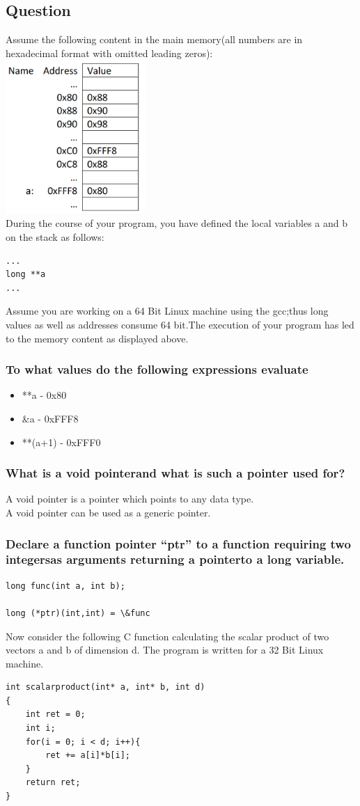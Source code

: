 \documentclass[12pt, a4paper]{article}
\begin{document}
		\subsection{Question}
			Assume the following content in the main memory(all numbers are in hexadecimal format with omitted leading zeros):\\
			\includegraphics[width=200px]{assets/164.png}\\
			During the course of your program, you have defined the local variables a and b on the stack as follows:
			\begin{lstlisting}
...
long **a
...\end{lstlisting}
			Assume  you  are  working  on  a  64 Bit  Linux  machine  using  the  gcc;thus long  values  as  well  as addresses  consume  64  bit.The  execution  of  your  program  has  led  to  the  memory  content  as displayed above.
			\subsubsection{To what values do the following expressions evaluate}
				\begin{itemize}
					\item **a - 0x80
					\item \&a - 0xFFF8
					\item **(a+1) - 0xFFF0
				\end{itemize}
			\subsubsection{What is a void pointerand what is such a pointer used for?}
				A void pointer is a pointer which points to any data type.\\
				A void pointer can be used as a generic pointer.
			\subsubsection{Declare  a function  pointer “ptr” to  a  function  requiring two  integersas  arguments returning a pointerto a long variable.}
				\begin{lstlisting}
long func(int a, int b);

long (*ptr)(int,int) = \&func\end{lstlisting}
			Now consider the following C function calculating the scalar product of two vectors a and  b of dimension d. The program is written for a 32 Bit Linux machine.
				\begin{lstlisting}
int scalarproduct(int* a, int* b, int d)
{
	int ret = 0;
	int i;
	for(i = 0; i < d; i++){
		ret += a[i]*b[i];
	}
	return ret;
}\end{lstlisting}
\end{document}
